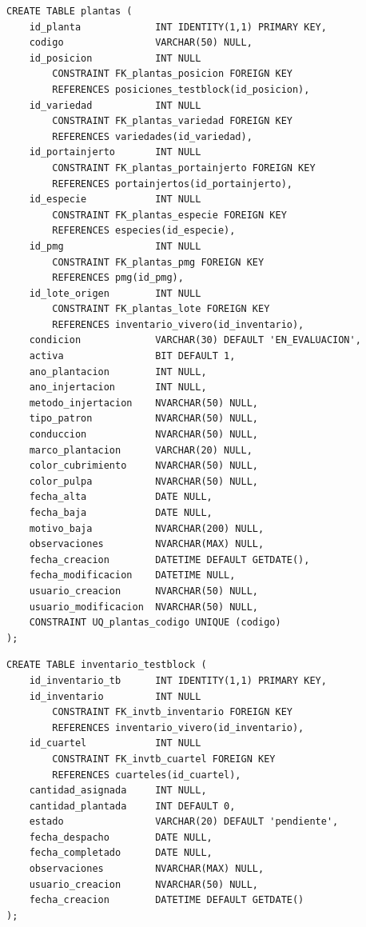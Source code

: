 \documentclass[12pt,a4paper,twoside]{report}
\begin{document}
\begin{lstlisting}[style=sqlstyle, caption={plantas}]
CREATE TABLE plantas (
    id_planta             INT IDENTITY(1,1) PRIMARY KEY,
    codigo                VARCHAR(50) NULL,
    id_posicion           INT NULL
        CONSTRAINT FK_plantas_posicion FOREIGN KEY
        REFERENCES posiciones_testblock(id_posicion),
    id_variedad           INT NULL
        CONSTRAINT FK_plantas_variedad FOREIGN KEY
        REFERENCES variedades(id_variedad),
    id_portainjerto       INT NULL
        CONSTRAINT FK_plantas_portainjerto FOREIGN KEY
        REFERENCES portainjertos(id_portainjerto),
    id_especie            INT NULL
        CONSTRAINT FK_plantas_especie FOREIGN KEY
        REFERENCES especies(id_especie),
    id_pmg                INT NULL
        CONSTRAINT FK_plantas_pmg FOREIGN KEY
        REFERENCES pmg(id_pmg),
    id_lote_origen        INT NULL
        CONSTRAINT FK_plantas_lote FOREIGN KEY
        REFERENCES inventario_vivero(id_inventario),
    condicion             VARCHAR(30) DEFAULT 'EN_EVALUACION',
    activa                BIT DEFAULT 1,
    ano_plantacion        INT NULL,
    ano_injertacion       INT NULL,
    metodo_injertacion    NVARCHAR(50) NULL,
    tipo_patron           NVARCHAR(50) NULL,
    conduccion            NVARCHAR(50) NULL,
    marco_plantacion      VARCHAR(20) NULL,
    color_cubrimiento     NVARCHAR(50) NULL,
    color_pulpa           NVARCHAR(50) NULL,
    fecha_alta            DATE NULL,
    fecha_baja            DATE NULL,
    motivo_baja           NVARCHAR(200) NULL,
    observaciones         NVARCHAR(MAX) NULL,
    fecha_creacion        DATETIME DEFAULT GETDATE(),
    fecha_modificacion    DATETIME NULL,
    usuario_creacion      NVARCHAR(50) NULL,
    usuario_modificacion  NVARCHAR(50) NULL,
    CONSTRAINT UQ_plantas_codigo UNIQUE (codigo)
);
\end{lstlisting}

\begin{lstlisting}[style=sqlstyle, caption={inventario\_testblock}]
CREATE TABLE inventario_testblock (
    id_inventario_tb      INT IDENTITY(1,1) PRIMARY KEY,
    id_inventario         INT NULL
        CONSTRAINT FK_invtb_inventario FOREIGN KEY
        REFERENCES inventario_vivero(id_inventario),
    id_cuartel            INT NULL
        CONSTRAINT FK_invtb_cuartel FOREIGN KEY
        REFERENCES cuarteles(id_cuartel),
    cantidad_asignada     INT NULL,
    cantidad_plantada     INT DEFAULT 0,
    estado                VARCHAR(20) DEFAULT 'pendiente',
    fecha_despacho        DATE NULL,
    fecha_completado      DATE NULL,
    observaciones         NVARCHAR(MAX) NULL,
    usuario_creacion      NVARCHAR(50) NULL,
    fecha_creacion        DATETIME DEFAULT GETDATE()
);
\end{lstlisting}
\end{document}
